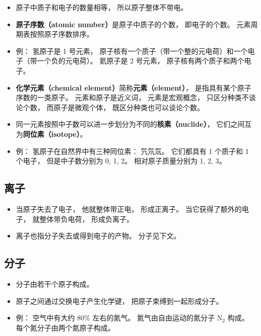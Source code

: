 \begin{itemize}
\item 原子中质子和电子的数量相等， 所以原子整体不带电。
\item \textbf{原子序数（atomic number）}是原子中质子的个数， 即电子的个数。 元素周期表按照原子序数排序。
\item 例： 氢原子是 1 号元素， 原子核有一个质子（带一个整的元电荷）和一个电子（带一个负的元电荷）。 氦原子是 2 号元素， 原子核有两个质子和两个电子。
\item \textbf{化学元素（chemical element）}简称\textbf{元素（element）}， 是指具有某个原子序数的一类原子。 元素和原子是近义词， 元素是宏观概念， 只区分种类不谈论个数， 而原子是微观个体， 既区分种类也可以谈论个数。
\item 同一元素按照中子数可以进一步划分为不同的\textbf{核素（nuclide）}， 它们之间互为\textbf{同位素（isotope）}。
\item 例： 氢原子在自然界中有三种同位素： 氕氘氚。 它们都具有 1 个质子和 1 个电子， 但是中子数分别为 0, 1, 2。 相对原子质量分别为 1, 2, 3。
\end{itemize}

\subsection{离子}
\begin{itemize}
\item 当原子失去了电子， 他就整体带正电， 形成正离子。 当它获得了额外的电子， 就整体带负电荷， 形成负离子。
\item 离子也指分子失去或得到电子的产物。 分子见下文。
\end{itemize}

\subsection{分子}
\begin{itemize}
\item 分子由若干个原子构成。
\item 原子之间通过交换电子产生化学键， 把原子束缚到一起形成分子。
\item 例： 空气中有大约 80\% 左右的氮气。 氮气由自由运动的氮分子 $\mathrm{N}_2$ 构成。 每个氮分子由两个氮原子构成。
\end{itemize}
